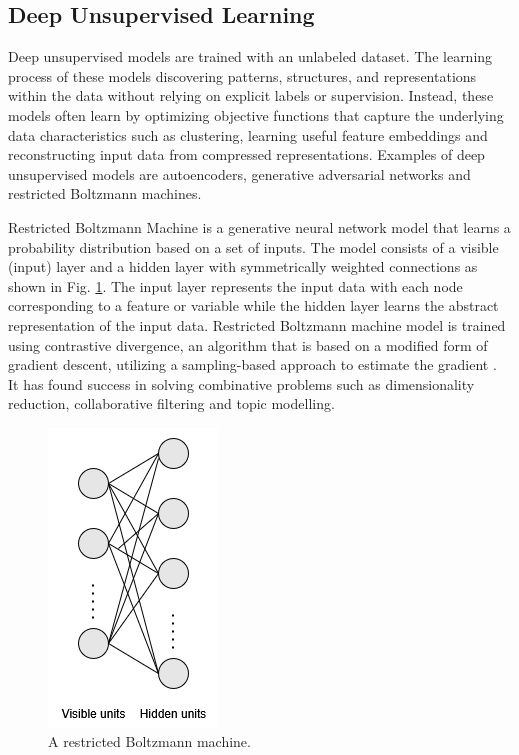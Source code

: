 \documentclass[preprint,12pt]{elsarticle}
\begin{document}
\subsection{Deep Unsupervised Learning}
Deep unsupervised models are trained with an unlabeled dataset. The learning process of these models discovering patterns, structures, and representations within the data without relying on explicit labels or supervision. Instead, these models often learn by optimizing objective functions that capture the underlying data characteristics such as clustering, learning useful feature embeddings and reconstructing input data from compressed representations. Examples of deep unsupervised models are autoencoders, generative adversarial networks and restricted Boltzmann machines.

Restricted Boltzmann Machine is a generative neural network model that learns a probability distribution based on a set of inputs. The model consists of a visible (input) layer and a hidden layer with symmetrically weighted connections as shown in Fig. \ref{fig_deep_unsv_learning_rbm}. The input layer represents the input data with each node corresponding to a feature or variable while the hidden layer learns the abstract representation of the input data. Restricted Boltzmann machine model is trained using contrastive divergence, an algorithm that is based on a modified form of gradient descent, utilizing a sampling-based approach to estimate the gradient \citep{hinton_practical_2012}. It has found success in solving combinative problems such as dimensionality reduction, collaborative filtering and topic modelling.

\begin{figure}[h!]
    \centering
    \includegraphics[scale=0.6]{fig_deep_unsv_learning_rbm.png}
    \caption{A restricted Boltzmann machine.}
    \label{fig_deep_unsv_learning_rbm}
\end{figure}
\end{document}
